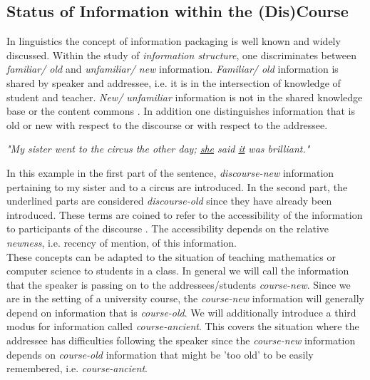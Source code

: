\documentclass[twoside, 12pt]{article}
\begin{document}
\subsection{Status of Information within the (Dis)Course}
\label{sec:infostatus}

In linguistics the concept of information packaging \cite{CambridgeGrammar:npentrel14} is well known and widely discussed. Within the study of \textit{information structure}, one discriminates between \textit{familiar/ old} and \textit{unfamiliar/ new} information. \textit{Familiar/ old} information is shared by speaker and addressee, i.e. it is in the intersection of knowledge of student and teacher. \textit{New/ unfamiliar} information is not in the shared knowledge base or the content commons \cite{CNX:whitepaper}. In addition one distinguishes information that is old or new with respect to the discourse or with respect to the addressee.

\begin{center}
\textit{"My sister went to the circus the other day; \underline{she} said \underline{it} was brilliant."}\\
\end{center}

In this example in the first part of the sentence, \textit{discourse-new} information pertaining to my sister and to a circus are introduced. In the second part, the underlined parts are considered \textit{discourse-old} since they have already been introduced. These terms are coined to refer to the accessibility of the information to participants of the discourse \cite{Newness:npentrel14}. The accessibility depends on the relative \textit{newness}, i.e. recency of mention, of this information.\\

These concepts can be adapted to the situation of teaching mathematics or computer science to students in a class. In general we will call the information that the speaker is passing on to the addressees/students \textit{course-new}. Since we are in the setting of a university course, the \textit{course-new} information will generally depend on information that is \textit{course-old}. We will additionally introduce a third modus for information called \textit{course-ancient}. This covers the situation where the addressee has difficulties following the speaker since the \textit{course-new} information depends on \textit{course-old} information that might be 'too old' to be easily remembered, i.e. \textit{course-ancient}.\\
\end{document}
